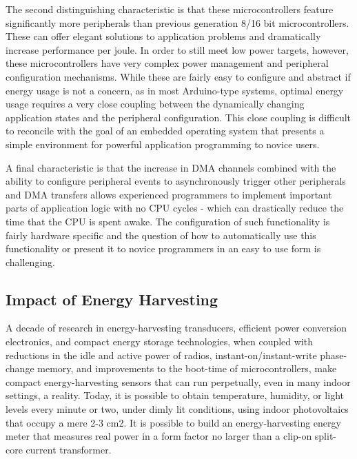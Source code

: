 The second distinguishing characteristic is that these microcontrollers
feature significantly more peripherals than previous generation 8/16 bit
microcontrollers. These can offer elegant solutions to application problems
and dramatically increase performance per joule. In order to still meet low
power targets, however, these microcontrollers have very complex power
management and peripheral configuration mechanisms. While these are fairly
easy to configure and abstract if energy usage is not a concern, as in most
Arduino-type systems, optimal energy usage requires a very close coupling
between the dynamically changing application states and the peripheral
configuration. This close coupling is difficult to reconcile with the goal of
an embedded operating system that presents a simple environment for powerful
application programming to novice users.

A final characteristic is that the increase in DMA channels combined with the
ability to configure peripheral events to asynchronously trigger other
peripherals and DMA transfers allows experienced programmers to implement
important parts of application logic with no CPU cycles - which can
drastically reduce the time that the CPU is spent awake. The configuration of
such functionality is fairly hardware specific and the question of how to
automatically use this functionality or present it to novice programmers in an
easy to use form is challenging.

\subsection{Impact of Energy Harvesting}

A decade of research in energy-harvesting transducers, efficient power
conversion electronics, and compact energy storage technologies, when coupled
with reductions in the idle and active power of radios,
instant-on/instant-write phase-change memory, and improvements to the
boot-time of microcontrollers, make compact energy-harvesting sensors that can
run perpetually, even in many indoor settings, a reality.  Today, it is
possible to obtain temperature, humidity, or light levels every minute or two,
under dimly lit conditions, using indoor photovoltaics that occupy a mere 2-3
cm2.  It is possible to build an energy-harvesting energy meter that measures
real power in a form factor no larger than a clip-on split-core current
transformer.

